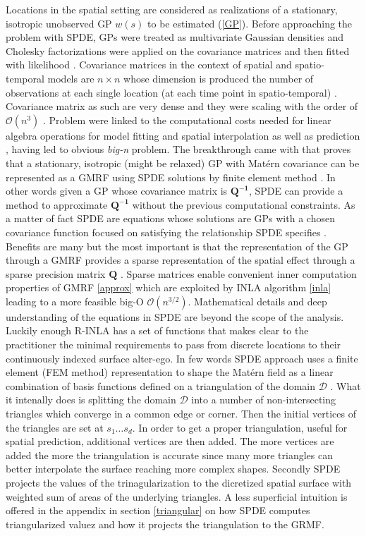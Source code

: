 \documentclass[
  12pt,
  a4paper,
  oneside]{book}
\theoremstyle{definition}
\theoremstyle{definition}
\theoremstyle{definition}
\theoremstyle{remark}
\begin{document}
Locations in the spatial setting are considered as realizations of a stationary, isotropic unobserved GP \(w(s)\) to be estimated (\ref{GP}). Before approaching the problem with SPDE, GPs were treated as multivariate Gaussian densities and Cholesky factorizations were applied on the covariance matrices and then fitted with likelihood \citep{LecturePaci}. Covariance matrices in the context of spatial and spatio-temporal models \citep{PACI2017149, Cameletti2012} are \(n \times n\) whose dimension is produced the number of observations at each single location (at each time point in spatio-temporal) \citep{BLANGIARDO201339}. Covariance matrix as such are very dense and they were scaling with the order of \(\mathcal{O}\left(n^{3}\right)\) \citep{Banerjee-Gelfand}. Problem were linked to the computational costs needed for linear algebra operations for model fitting and spatial interpolation as well as prediction \citep{Cameletti2012}, having led to obvious \emph{big-n} problem.
The breakthrough came with \citet{Lindgren2011} that proves that a stationary, isotropic (might be relaxed) GP with Matérn covariance can be represented as a GMRF using SPDE solutions by finite element method \citep{Krainski-Rubio}. In other words given a GP whose covariance matrix is \(\boldsymbol{Q^{-1}}\), SPDE can provide a method to approximate \(\boldsymbol{Q^{-1}}\) without the previous computational constraints. As a matter of fact SPDE are equations whose solutions are GPs with a chosen covariance function focused on satisfying the relationship SPDE specifies \citeyearpar{Krainski-Rubio}.
Benefits are many but the most important is that the representation of the GP through a GMRF provides a sparse representation of the spatial effect through a sparse precision matrix \(\boldsymbol{Q}\) . Sparse matrices enable convenient inner computation properties of GMRF \ref{approx} which are exploited by INLA algorithm \ref{inla} leading to a more feasible big-O \(\mathcal{O}\left(n^{3 / 2}\right)\). Mathematical details and deep understanding of the equations in SPDE are beyond the scope of the analysis. Luckily enough R-INLA has a set of functions that makes clear to the practitioner the minimal requirements to pass from discrete locations to their continuously indexed surface alter-ego.
In few words SPDE approach uses a finite element (FEM method) representation to shape the Matérn field as a linear combination of basis functions defined on a triangulation of the domain \(\mathcal{D}\) \citeyearpar{Cameletti2012}. What it intenally does is splitting the domain \(\mathcal{D}\) into a number of non-intersecting triangles which converge in a common edge or corner. Then the initial vertices of the triangles are set at \(s_1 \ldots s_d\). In order to get a proper triangulation, useful for spatial prediction, additional vertices are then added. The more vertices are added the more the triangulation is accurate since many more triangles can better interpolate the surface reaching more complex shapes. Secondly SPDE projects the values of the trinagularization to the dicretized spatial surface with weighted sum of areas of the underlying triangles. A less superficial intuition is offered in the appendix in section \ref{triangular} on how SPDE computes triangularized valuez and how it projects the triangulation to the GRMF.\\
\end{document}
